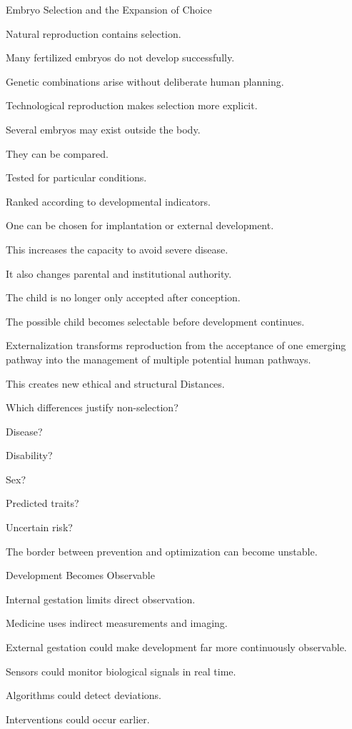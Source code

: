 Embryo Selection and the Expansion of Choice

Natural reproduction contains selection.

Many fertilized embryos do not develop successfully.

Genetic combinations arise without deliberate human planning.

Technological reproduction makes selection more explicit.

Several embryos may exist outside the body.

They can be compared.

Tested for particular conditions.

Ranked according to developmental indicators.

One can be chosen for implantation or external development.

This increases the capacity to avoid severe disease.

It also changes parental and institutional authority.

The child is no longer only accepted after conception.

The possible child becomes selectable before development continues.

Externalization transforms reproduction from the acceptance of one emerging pathway into the management of multiple potential human pathways.

This creates new ethical and structural Distances.

Which differences justify non-selection?

Disease?

Disability?

Sex?

Predicted traits?

Uncertain risk?

The border between prevention and optimization can become unstable.

Development Becomes Observable

Internal gestation limits direct observation.

Medicine uses indirect measurements and imaging.

External gestation could make development far more continuously observable.

Sensors could monitor biological signals in real time.

Algorithms could detect deviations.

Interventions could occur earlier.

